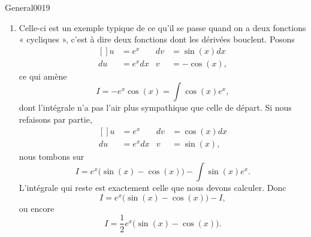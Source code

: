 \begin{corrige}{General0019}
\begin{enumerate}
\item
Celle-ci est un exemple typique de ce qu'il se passe quand on a deux fonctions « cycliques », c'est à dire deux fonctions dont les dérivées bouclent. Posons
\begin{equation}
	\begin{aligned}[]
		u&=e^x		&	dv&=\sin(x)dx\\
		du&=e^xdx	&	v&=-\cos(x),
	\end{aligned}
\end{equation}
ce qui amène
\begin{equation}
	I=-e^x\cos(x)=\int\cos(x)e^x,
\end{equation}
dont l'intégrale n'a pas l'air plus sympathique que celle de départ. Si nous refaisons par partie,
\begin{equation}
	\begin{aligned}[]
		u&=e^x		&	dv&=\cos(x)dx\\
		du&=e^xdx	&	v&=\sin(x),
	\end{aligned}
\end{equation}
nous tombons sur
\begin{equation}
	I=e^x\big( \sin(x)-\cos(x) \big)-\int\sin(x)e^x.
\end{equation}
L'intégrale qui reste est exactement celle que nous devons calculer. Donc
\begin{equation}
	I=e^x\big( \sin(x)-\cos(x) \big)-I,
\end{equation}
ou encore
\begin{equation}
	I=\frac{1}{ 2 }e^x\big( \sin(x)-\cos(x) \big).
\end{equation}

\end{enumerate}


\end{corrige}

